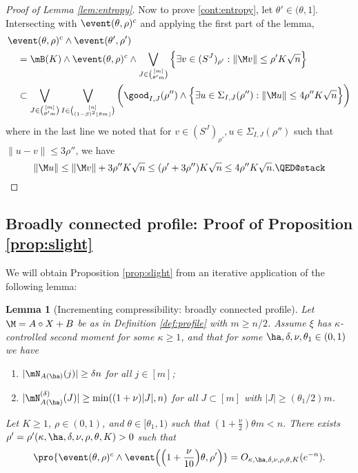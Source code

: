 \documentclass[aop,preprint]{imsart}
\theoremstyle{plain}
\newtheorem{lemma}[theorem]{Lemma}
\theoremstyle{definition}
\theoremstyle{remark}
\numberwithin{equation}{section}
\numberwithin{theorem}{section}
\def \lf {\lfloor}
\def \rf {\rfloor}
\begin{document}
\begin{proof}[Proof of Lemma \ref{lem:entropy}]
Now to prove \eqref{cont:entropy}, let $\theta'\in (\theta,1]$.
Intersecting with $\event(\theta,\rho)^c$ and applying the first part of the lemma,
\begin{align}
&\event(\theta,\rho)^c\wedge\event(\theta',\rho') \notag\\
&\quad = \mB(K)\wedge\event(\theta,\rho)^c\wedge\bigvee_{J\in {[m]\choose  \theta' m}} \Big\{\exists v\in (S^J)_{\rho'}: \|\M v\|\le \rho' K\sqrt{n}\Big\}\notag\\
&\quad\subset
\bigvee_{J\in {[m]\choose \theta' m}} \bigvee_{I\in {[n]\choose  (1-\beta)^2\lf \theta m\rf}} \bigg(  \good_{I,J}(\rho'')
\wedge\Big\{ \exists u \in \Sigma_{I,J}(\rho''): \|\M u\|\le 4\rho''K\sqrt{n} \Big\}\bigg)	
\end{align}
where in the last line we noted that for $v\in (S^J)_{\rho'}, u\in \Sigma_{I,J}(\rho'')$ such that $\|u-v\|\le 3\rho''$, we have 
\[
\|\M u\|\le \|\M v\|+3\rho'' K\sqrt{n} \le (\rho'+3\rho'')K\sqrt{n}\le 4\rho'' K\sqrt{n}.\qedhere
\]
\end{proof}



\subsection{Broadly connected profile: Proof of Proposition \ref{prop:slight}}

We will obtain Proposition \ref{prop:slight} from an iterative application of the following lemma:

\begin{lemma}[Incrementing compressibility: broadly connected profile]	\label{lem:increment_broad}
Let $\M=A\circ X+B$ be as in Definition \ref{def:profile} with $m\ge n/2$.
Assume $\xi$ has $\kappa$-controlled second moment for some $\kappa\ge1$, and that for some $\ha,\delta,\nu,\theta_1\in (0,1)$ we have
\begin{enumerate}[(1)]
\item $|\mN_{A(\ha)}(j)|\ge \delta n$ for all $j\in [m]$;
\item $|\mN_{A(\ha)}^{(\delta)}(J)|\ge \min((1+\nu) |J|,n)$ for all $J\subset[m]$ with $|J|\ge (\theta_1/2)m$.
\end{enumerate}
Let $K\ge1$, $\rho\in (0,1)$, and $\theta\in [\theta_1,1)$ such that $(1+\frac\nu2)\theta m<n$.
There exists $\rho'=\rho'(\kappa,\ha,\delta,\nu,\rho,\theta,K)>0$ such that
\begin{equation}
\pro{ \event(\theta,\rho)^c \wedge \event\Big( \Big(1+\frac{\nu}{10}\Big)\theta,\rho'\Big)} 
=O_{\kappa,\ha,\delta,\nu,\rho,\theta,K}(e^{-n}).
\end{equation}
\end{lemma}
\end{document}
